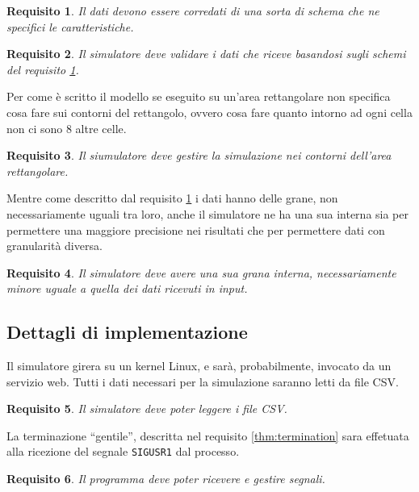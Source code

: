 \documentclass[draft]{article}
\newcommand{\eng}[1]{\foreignlanguage{english}{#1}} %
\newtheorem{requirement}{Requisito}
\begin{document}
\begin{requirement}\label{thm:schema}
Il dati devono essere corredati di una sorta di schema che ne specifici le
caratteristiche.
\end{requirement}

\begin{requirement}
Il simulatore deve validare i dati che riceve basandosi sugli schemi del
requisito \ref{thm:schema}.
\end{requirement}

Per come è scritto il modello se eseguito su un'area rettangolare non specifica
cosa fare sui contorni del rettangolo, ovvero cosa fare quanto intorno ad ogni
cella non ci sono 8 altre celle.

\begin{requirement}\label{thm:boundary}
Il siumulatore deve gestire la simulazione nei contorni dell'area rettangolare.
\end{requirement}

Mentre come descritto dal requisito \ref{thm:schema} i dati hanno delle grane,
non necessariamente uguali tra loro, anche il simulatore ne ha una sua interna
sia per permettere una maggiore precisione nei risultati che per permettere dati
con granularità diversa.

\begin{requirement}\label{thm:grain}
Il simulatore deve avere una sua grana interna, necessariamente minore uguale a
quella dei dati ricevuti in \eng{input}.
\end{requirement}

\subsection{Dettagli di implementazione}

Il simulatore girera su un \eng{kernel} Linux, e sarà, probabilmente, invocato
da un servizio \eng{web}. Tutti i dati necessari per la simulazione saranno
letti da \eng{file} CSV.

\begin{requirement}
Il simulatore deve poter leggere i \eng{file} CSV.
\end{requirement}

La terminazione ``gentile'', descritta nel requisito \ref{thm:termination} sara
effetuata alla ricezione del segnale \texttt{SIGUSR1} dal processo.

\begin{requirement}
Il programma deve poter ricevere e gestire segnali.
\end{requirement}
\end{document}
